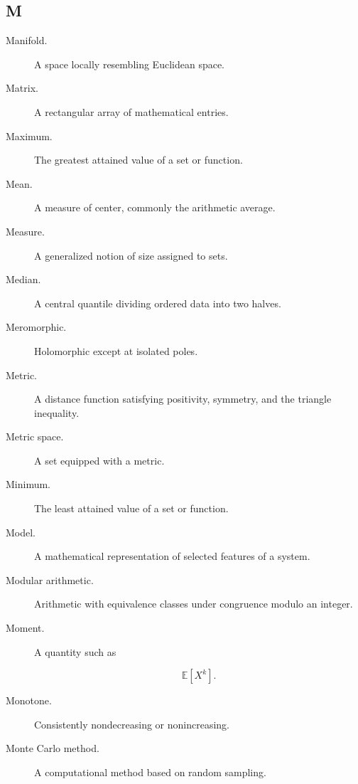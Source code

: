 \subsection*{M}

\begin{description}

\item[Manifold.]
A space locally resembling Euclidean space.

\item[Matrix.]
A rectangular array of mathematical entries.

\item[Maximum.]
The greatest attained value of a set or function.

\item[Mean.]
A measure of center, commonly the arithmetic average.

\item[Measure.]
A generalized notion of size assigned to sets.

\item[Median.]
A central quantile dividing ordered data into two halves.

\item[Meromorphic.]
Holomorphic except at isolated poles.

\item[Metric.]
A distance function satisfying positivity, symmetry, and the triangle
inequality.

\item[Metric space.]
A set equipped with a metric.

\item[Minimum.]
The least attained value of a set or function.

\item[Model.]
A mathematical representation of selected features of a system.

\item[Modular arithmetic.]
Arithmetic with equivalence classes under congruence modulo an integer.

\item[Moment.]
A quantity such as

\[
\mathbb{E}[X^k].
\]

\item[Monotone.]
Consistently nondecreasing or nonincreasing.

\item[Monte Carlo method.]
A computational method based on random sampling.

\end{description}

